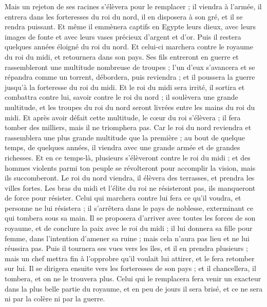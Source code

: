 \begin{multicols}{2}
Mais un rejeton de ses racines s’élèvera pour le remplacer ; il viendra à l’armée, il entrera dans les forteresses du roi du nord, il en disposera à son gré, et il se rendra puissant.
Et même il emmènera captifs en Egypte leurs dieux, avec leurs images de fonte et avec leurs vases précieux d'argent et d'or.  Puis il restera quelques années éloigné du roi du nord.
Et celui-ci marchera contre le royaume du roi du  midi, et retournera dans son pays.
Ses fils  entreront en guerre et rassembleront une multitude nombreuse de troupes ; l'un d'eux s’avancera et se répandra comme un torrent,  débordera, puis reviendra ; et il poussera la guerre jusqu'à la forteresse du roi du midi.
Et le roi du midi sera irrité, il sortira et combattra contre lui, savoir contre le roi du nord ; il soulèvera une grande multitude, et les troupes du roi du nord seront livrées entre les mains du roi du midi.
Et après avoir défait cette multitude, le cœur du roi s’élèvera ; il fera tomber des milliers, mais il ne triomphera pas.
Car le roi du nord reviendra et rassemblera une plus grande multitude que la première ; au bout de quelque temps, de quelques années, il viendra avec une grande armée et de grandes richesses.
Et en ce temps-là, plusieurs s'élèveront contre le roi du midi ; et des hommes violents parmi ton peuple se révolteront pour accomplir la vision, mais ils succomberont.
Le roi du nord viendra, il élèvera des terrasses, et prendra les villes fortes.  Les bras du midi et l’élite du roi ne résisteront pas, ils manqueront de force pour résister.
Celui qui marchera contre lui fera ce qu’il voudra, et personne ne lui résistera ; il s’arrêtera dans le pays de noblesse, exterminant ce qui tombera sous sa main.
Il se proposera d’arriver avec toutes les forces de son royaume, et de conclure la paix avec le roi du midi ; il lui donnera sa fille pour femme, dans l’intention d’amener sa ruine ; mais cela n’aura pas lieu et ne lui réussira pas.
Puis il tournera ses vues vers les îles, et il en prendra plusieurs ; mais un chef mettra fin à l'opprobre qu'il voulait lui attirer, et le fera retomber sur lui.
Il se dirigera ensuite vers les forteresses de son pays ; et il chancellera, il tombera, et on ne le trouvera plus.
Celui qui le remplacera fera venir un exacteur dans la plus belle partie du royaume, et en peu de jours il sera brisé, et ce ne sera ni par la colère ni par la guerre.

\end{multicols}
